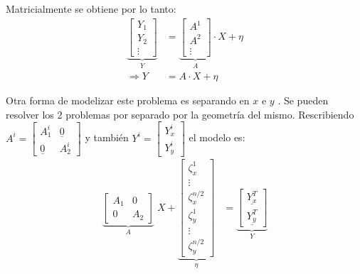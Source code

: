 	Matricialmente se obtiene por lo tanto:
	\begin{align*}
		\underbrace{\begin{bmatrix} Y_1 \\[0.3em] Y_2 \\[0.3em] \vdots\end{bmatrix}}_{Y} &= \underbrace{\begin{bmatrix} A^1\\[0.3em] A^2\\[0.3em] \vdots\end{bmatrix}}_{A}\cdot X + \eta\\
		\Rightarrow Y &= A\cdot X + \eta
	\end{align*}

	Otra forma de modelizar este problema es separando en $x$ e $y$ \vspace{0.1cm}. Se pueden resolver los 2 problemas por separado por la geometría del mismo. Rescribiendo $A^i = \begin{bmatrix} A^i_1 & \underline{0} \\[0.3em] \underline{0} & A^i_2 \end{bmatrix}$ y también $Y^i = \begin{bmatrix} Y^i_x \\[0.3em] Y^i_y \end{bmatrix}$ el modelo es:
	\begin{align*}
	\underbrace{\begin{bmatrix} A_1 & 0 \\[0.3em] 0 & A_2 \end{bmatrix}}_A \; X + \underbrace{\begin{bmatrix}\zeta^1_x\\ \vdots\\ \zeta^{n/2}_x \\ \zeta^1_y \\ \vdots \\ \zeta^{n/2}_y \end{bmatrix}}_\eta &= \underbrace{\begin{bmatrix} \underline{Y^T_x} \\[0.3em] \underline{Y^T_y} \end{bmatrix}}_Y
	\end{align*}

